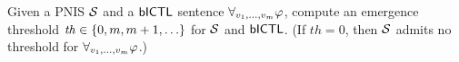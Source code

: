 \begin{definition}
  Given a PNIS $\mathcal{S}$ and a $\sf{bICTL}$ sentence $\forall_{v_1,\ldots,v_m} \varphi$, compute an
  emergence threshold $\mathit{th} \in \left \{ 0, m, m+1, \ldots \right \}$ for $\mathcal{S}$ and
  $\sf{bICTL}$.  (If $\mathit{th}=0$, then $\mathcal{S}$ admits no threshold for
  $\forall_{v_1,\ldots,v_m} \varphi$.)
\end{definition}
  








